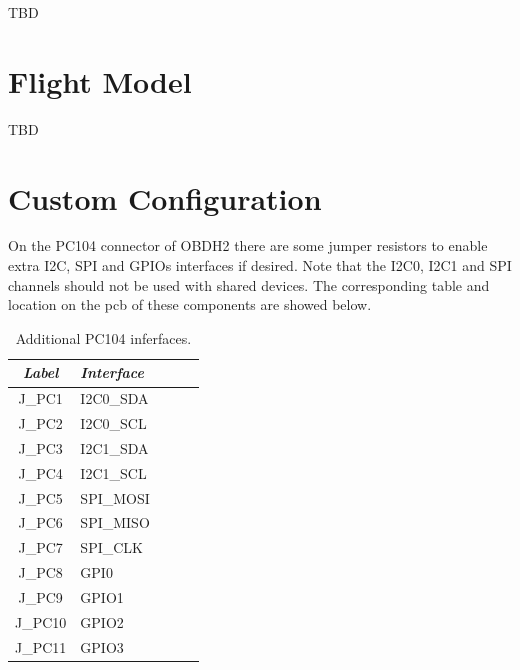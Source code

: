 TBD

\section{Flight Model}

TBD

\section{Custom Configuration}

On the PC104 connector of OBDH2 there are some jumper resistors to enable extra I2C, SPI and GPIOs interfaces if desired. Note that the I2C0, I2C1 and SPI channels should not be used with shared devices. The corresponding table and location on the pcb of these components are showed below. 

\begin{table}[!h]
    \centering
    \begin{tabular}{cllll}
        \toprule[1.5pt]
        \textit{Label} & \textit{Interface} \\
        \midrule
        J\_PC1            & I2C0\_SDA  \\
        J\_PC2            & I2C0\_SCL  \\
        J\_PC3            & I2C1\_SDA       \\
        J\_PC4            & I2C1\_SCL       \\
        J\_PC5            & SPI\_MOSI           \\
        J\_PC6            & SPI\_MISO            \\
        J\_PC7            & SPI\_CLK            \\
        J\_PC8            & GPI0            \\
        J\_PC9            & GPIO1            \\
        J\_PC10            & GPIO2            \\
        J\_PC11            & GPIO3            \\
        \bottomrule[1.5pt]
    \end{tabular}
    \caption{Additional PC104 inferfaces.}
    \label{tab:additional-pc104-inferfaces}
\end{table}

